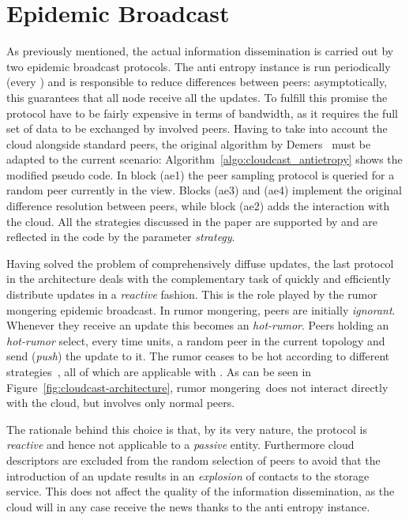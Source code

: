 \section{Epidemic Broadcast}
\label{sec:epidemicbroadcast}
As previously mentioned, the actual information dissemination is
carried out by two epidemic broadcast protocols. The
anti entropy instance is run periodically (every \deltaAntiEntropy)
and is responsible to
reduce differences between peers: asymptotically, this guarantees that
all node receive all the updates. To fulfill this promise the
protocol have to be fairly expensive in terms of bandwidth, as it
requires the full set of data to be exchanged by involved
peers. Having to take into account the cloud alongside standard peers,
the original algorithm by Demers~\cite{EpidemicAlgorithms} must be
adapted to the current scenario:
Algorithm~\ref{algo:cloudcast_antietropy} shows the modified pseudo
code.
In block (ae1) the \cloudcast peer sampling protocol is queried
for a random peer currently in the view. Blocks (ae3) and (ae4)
implement the original difference resolution between peers, while
block (ae2) adds the interaction with the cloud.
All the strategies discussed in the paper are supported by
\cloudcast and are reflected in the code by the parameter
\emph{strategy}.



Having solved the problem of comprehensively diffuse updates, the last
protocol in the architecture deals with the complementary task of
quickly and efficiently distribute updates in a \emph{reactive} fashion. This is the
role played by the rumor mongering epidemic broadcast.
In rumor mongering, peers are initially \emph{ignorant}. Whenever they
receive an update this becomes an \emph{hot-rumor}. Peers holding an
\emph{hot-rumor}
select, every \deltaRumorMongering time units, a random peer in the current
topology and send (\emph{push}) the update to it. The rumor ceases to
be hot according to different strategies~\cite{EpidemicAlgorithms},
 all of which are applicable with \cloudcast.
As can be seen in Figure~\ref{fig:cloudcast-architecture}, rumor mongering\
does not interact directly with the cloud, but involves only normal
peers.

The rationale behind this choice is that, by its very nature, the
protocol is \emph{reactive} and hence not applicable to a
\emph{passive} entity. Furthermore cloud descriptors are
excluded from the random selection of peers to avoid that the
introduction of an update results in an \emph{explosion} of contacts
to the storage service. This does not affect the quality of the
information dissemination, as the cloud will in any case receive the
news thanks to the anti entropy instance.

